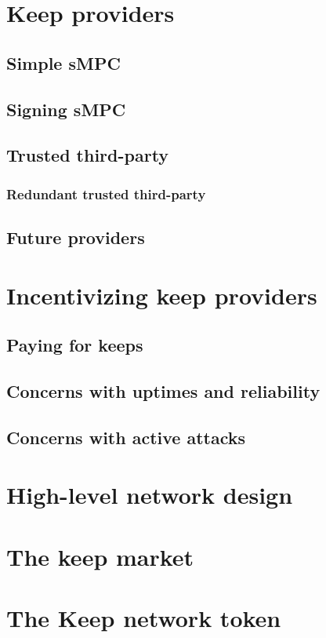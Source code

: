 \documentclass[11pt]{article}
\begin{document}
\section{Keep providers}
\subsection{Simple sMPC}
\subsection{Signing sMPC}
\subsection{Trusted third-party}
\subsubsection{Redundant trusted third-party}
\subsection{Future providers}

\section{Incentivizing keep providers}

\subsection{Paying for keeps}
\subsection{Concerns with uptimes and reliability}
\subsection{Concerns with active attacks}

\section{High-level network design}

\section{The keep market}
\section{The Keep network token}
\end{document}
